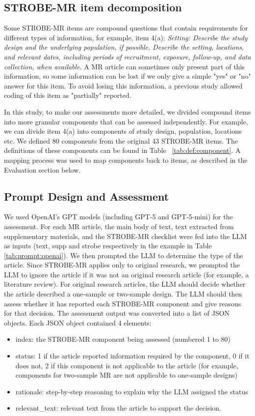 \subsection{STROBE-MR item decomposition}
Some STROBE-MR items are compound questions that contain requirements for different types of information, for example, item 4(a): \textit{Setting: Describe the study design and the underlying population, if possible. Describe the setting, locations, and relevant dates, including periods of recruitment, exposure, follow-up, and data collection, when available}. A MR article can sometimes only present part of this information, so some information can be lost if we only give a simple "yes" or "no" answer for this item. To avoid losing this information, a previous study\cite{gibson_reporting_2023} allowed coding of this item as "partially" reported. 

In this study, to make our assessments more detailed, we divided compound items into more granular components that can be assessed independently. For example, we can divide item 4(a) into components of study design, population, locations etc. We defined 80 components from the original 43 STROBE-MR items. The definitions of these components can be found in Table ~\ref{tab:def:component}. A mapping process was used to map components back to items, as described in the Evaluation section below.

\subsection{Prompt Design and Assessment}
We used OpenAI's GPT models (including GPT-5 and GPT-5-mini) for the assessment. For each MR article, the main body of text, text extracted from supplementary materials, and the STROBE-MR checklist were fed into the LLM as inputs ({text}, {supp} and {strobe} respectively in the example in Table \ref{tab:prompt:openai}). We then prompted the LLM to determine the type of the article. Since STROBE-MR applies only to original research, we prompted the LLM to ignore the article if it was not an original research article (for example, a literature review). For original research articles, the LLM should decide whether the article described a one-sample or two-sample design. The LLM should then assess whether it has reported each STROBE-MR component and give reasons for that decision. The assessment output was converted into a list of JSON objects. Each JSON object contained 4 elements: 
\begin{itemize}
    \item index: the STROBE-MR component being assessed (numbered 1 to 80)
    \item status: 1 if the article reported information required by the component, 0 if it does not, 2 if this component is not applicable to the article (for example, components for two-sample MR are not applicable to one-sample designs)
    \item rationale: step-by-step reasoning to explain why the LLM assigned the status
    \item relevant\_text: relevant text from the article to support the decision. 
\end{itemize}

